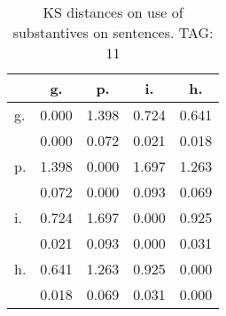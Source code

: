 \begin{table}[h!]
\begin{center}
\begin{tabular}{| l | c | c | c | c |}\hline
 & g. & p. & i. & h. \\\hline
g. & 0.000  & 1.398  & 0.724  & 0.641 \\\hline
 & 0.000  & 0.072  & 0.021  & 0.018 \\\hline
p. & 1.398  & 0.000  & 1.697  & 1.263 \\\hline
 & 0.072  & 0.000  & 0.093  & 0.069 \\\hline
i. & 0.724  & 1.697  & 0.000  & 0.925 \\\hline
 & 0.021  & 0.093  & 0.000  & 0.031 \\\hline
h. & 0.641  & 1.263  & 0.925  & 0.000 \\\hline
 & 0.018  & 0.069  & 0.031  & 0.000 \\\hline
\end{tabular}
\caption{KS distances on use of substantives on sentences. TAG: 11}
\end{center}
\end{table}